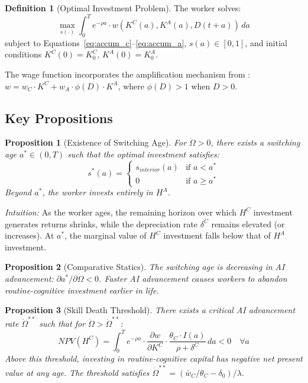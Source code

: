 \documentclass[11pt,a4paper]{article}
\newtheorem{proposition}{Proposition}
\theoremstyle{definition}
\newtheorem{definition}{Definition}
\begin{document}
\begin{definition}[Optimal Investment Problem]
The worker solves:
\begin{equation}
\max_{s(\cdot)} \int_0^T e^{-\rho a} \cdot w(K^C(a), K^A(a), D(t+a)) \, da
\label{eq:objective}
\end{equation}
subject to Equations~\eqref{eq:accum_c}--\eqref{eq:accum_a}, $s(a) \in [0,1]$, and initial conditions $K^C(0) = K_0^C$, $K^A(0) = K_0^A$.
\end{definition}

The wage function incorporates the amplification mechanism from \citet{espinal2026ahc}: $w = w_C \cdot K^C + w_A \cdot \phi(D) \cdot K^A$, where $\phi(D) > 1$ when $D > 0$.

\subsection{Key Propositions}

\begin{proposition}[Existence of Switching Age]
\label{prop:switching}
For $\dot{\Omega} > 0$, there exists a switching age $a^* \in (0, T)$ such that the optimal investment satisfies:
\begin{equation}
s^*(a) = \begin{cases} s_{interior}(a) & \text{if } a < a^* \\ 0 & \text{if } a \geq a^* \end{cases}
\end{equation}
Beyond $a^*$, the worker invests entirely in $H^A$.
\end{proposition}

\textit{Intuition:} As the worker ages, the remaining horizon over which $H^C$ investment generates returns shrinks, while the depreciation rate $\delta^C$ remains elevated (or increases). At $a^*$, the marginal value of $H^C$ investment falls below that of $H^A$ investment.

\begin{proposition}[Comparative Statics]
\label{prop:comparative}
The switching age is decreasing in AI advancement: $\partial a^* / \partial \dot{\Omega} < 0$. Faster AI advancement causes workers to abandon routine-cognitive investment earlier in life.
\end{proposition}

\begin{proposition}[Skill Death Threshold]
\label{prop:death}
There exists a critical AI advancement rate $\dot{\Omega}^{**}$ such that for $\dot{\Omega} > \dot{\Omega}^{**}$:
\begin{equation}
NPV(H^C) = \int_0^T e^{-\rho a} \cdot \frac{\partial w}{\partial K^C} \cdot \frac{\theta_C \cdot I(a)}{\rho + \delta^C} \, da < 0 \quad \forall a
\end{equation}
Above this threshold, investing in routine-cognitive capital has negative net present value at \textit{any} age. The threshold satisfies $\dot{\Omega}^{**} = (\bar{w}_C / \theta_C - \delta_0) / \lambda$.
\end{proposition}
\end{document}
